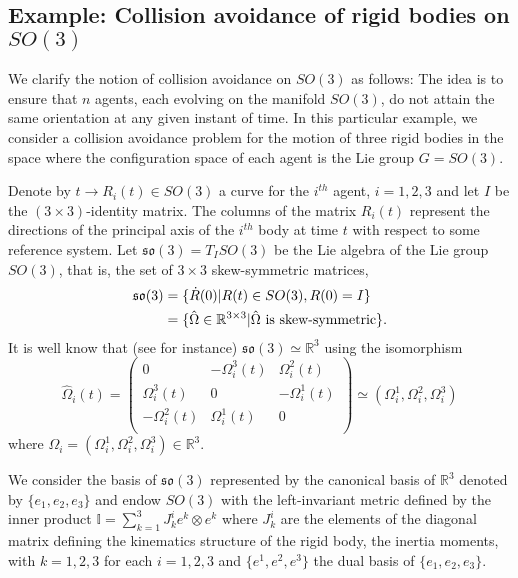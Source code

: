 \documentclass[letterpaper, 10 pt, conference]{ieeeconf}  %
\begin{document}
\subsection{Example: Collision avoidance of rigid bodies on $SO(3)$}
% 
We clarify the notion of collision avoidance on $SO(3)$ as follows: The idea is to ensure that $n$ agents, 
each evolving on the manifold $SO(3)$, do not attain the same orientation at any given instant of time. 
In this particular example, 
we consider a collision avoidance problem for the motion of three rigid bodies in the space where the configuration space of each agent is the Lie group $G=SO(3)$.  

 Denote by $t\to R_i(t)\in SO(3)$ a curve for the $i^{th}$ agent, $i=1,2,3$ and let $I$ be the $(3\times 3)$-identity matrix. The columns of the matrix $R_i(t)$ represent the directions of the principal axis of the $i^{th}$ body at time $t$ with respect to some reference system. Let $\mathfrak{so}(3)=T_{I}SO(3)$ be the Lie algebra of the Lie group $SO(3)$, that is, the set of $3\times 3$ skew-symmetric matrices, \begin{align*}\mathfrak{so}(3)&=\{\dot{R}(0)|R(t)\in SO(3), R(0)=I\}\\&=\{\hat{\Omega}\in\mathbb{R}^{3\times 3}|\hat{\Omega} \hbox{ is skew-symmetric}\}.\end{align*} It is well know that (see \cite{Bl} for instance)  $\mathfrak{so}(3)\simeq\mathbb{R}^3$ using the isomorphism $$\hat{\Omega}_i(t)=\left(
  \begin{array}{ccc}
    0& -\Omega^3_i(t) & \Omega^2_i(t) \\
    \Omega^3_i(t) & 0 & -\Omega^1_i(t) \\
    -\Omega^2_i(t) & \Omega^1_i(t) & 0 \\
  \end{array}
\right)\simeq(\Omega_i^{1},\Omega_{i}^{2},\Omega_i^{3})$$ where $\Omega_i=(\Omega_i^{1},\Omega_{i}^{2},\Omega_i^{3})\in\mathbb{R}^{3}$.%

We consider the basis of $\mathfrak{so}(3)$ represented by the canonical basis of $\mathbb{R}^3$ denoted by $\{e_1,e_2,e_3\}$ and  endow $SO(3)$ with the left-invariant metric  defined by the inner product $\displaystyle{\mathbb{I}=\sum_{k=1}^3J_k^{i}e^k\otimes e^k}$ where $J_k^i$ are the elements of the diagonal matrix defining the kinematics structure of the rigid body, the inertia moments, with $k=1,2,3$ for each $i=1,2,3$ and $\{e^{1},e^2,e^3\}$ the dual basis of $\{e_1,e_2,e_3\}$.
\end{document}
